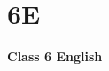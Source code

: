 \label{4 C6 English}
    \section{6E}
    \begin{frame}
    \begin{center}
    \begin{Huge}
        \textbf{Class 6 English}
    \end{Huge}
    \end{center}
    \end{frame}
 
    